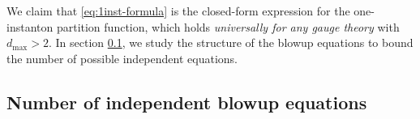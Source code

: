 \documentclass[letterpaper, 11pt]{article}
\def\CL{{\cal L}}
\def\e{\epsilon}
\def\w{\omega}
\begin{document}
We claim that \eqref{eq:1inst-formula} is the closed-form expression for the one-instanton partition function, which holds \emph{universally for any gauge theory} with $d_{\text{max}}>2$.  
In section \ref{subsec:numd}, we study the structure of the blowup equations to bound the number of possible independent equations.  



\subsection{Number of independent blowup equations} \label{subsec:numd}
\end{document}
